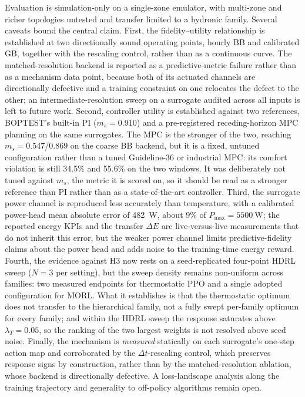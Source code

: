 \documentclass{ieeeaccess}
\newcommand{\ms}{\ensuremath{m_s}}
\begin{document}
Evaluation is simulation-only on a single-zone emulator, with multi-zone and richer topologies
untested and transfer limited to a hydronic family. Several caveats bound the central claim. First,
the fidelity--utility relationship is established at two directionally sound operating points,
hourly BB and calibrated GB, together with the rescaling control, rather than as a continuous curve.
The matched-resolution backend is reported as a predictive-metric failure rather than as a
mechanism data point, because both of its actuated channels are directionally defective and a
training constraint on one relocates the defect to the other; an intermediate-resolution sweep on a
surrogate audited across all inputs is left to future work.
Second, controller utility is established against two references, BOPTEST's built-in PI
($\ms=0.910$) and a pre-registered receding-horizon MPC planning on the same surrogates. The MPC is
the stronger of the two, reaching $\ms=0.547$/$0.869$ on the coarse BB backend, but it is a fixed,
untuned configuration rather than a tuned Guideline-36 or industrial MPC: its comfort violation is
still 34.5\% and 55.6\% on the two windows. It was deliberately not tuned against \ms{}, the metric
it is scored on, so it should be read as a stronger reference than PI rather than as a
state-of-the-art controller. Third, the surrogate power channel is
reproduced less accurately than temperature, with a calibrated power-head mean absolute error of
\SI{482}{\watt}, about 9\% of $P_{\max}=\SI{5500}{\watt}$; the reported energy KPIs and the transfer
$\Delta E$ are live-versus-live measurements that do not inherit this error, but the weaker power
channel limits predictive-fidelity claims about the power head and adds noise to the training-time
energy reward. Fourth, the evidence against H3 now rests on a seed-replicated four-point HDRL
sweep ($N=3$ per setting), but the sweep density remains non-uniform across families: two measured
endpoints for thermostatic PPO and a single adopted configuration for MORL. What it establishes is
that the thermostatic optimum does not transfer to the hierarchical family, not a fully swept
per-family optimum for every family; and within the HDRL sweep the response saturates above
$\lambda_T=0.05$, so the ranking of the two largest weights is not resolved above seed noise. Finally, the mechanism is
\emph{measured} statically on each surrogate's one-step action map and corroborated by the
$\Delta t$-rescaling control, which preserves response signs by construction, rather than by the
matched-resolution ablation, whose backend is directionally defective. A loss-landscape analysis
along the training trajectory and generality to off-policy algorithms remain open.
\end{document}

